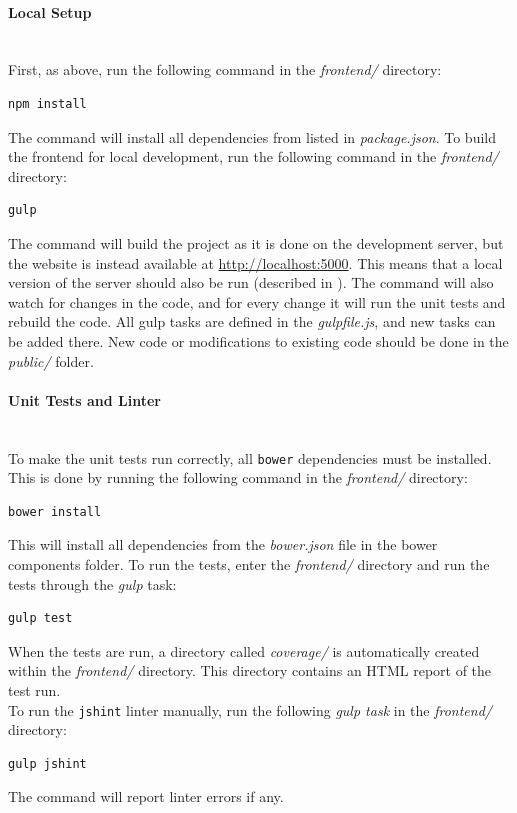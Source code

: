 \paragraph*{Local Setup} \hfill \\
First, as above, run the following command in the \textit{frontend/} directory:
\begin{lstlisting}[language=sh]
npm install
\end{lstlisting}
The command will install all dependencies from listed in \textit{package.json}.
\noindent
To build the frontend for local development, run the following command in the \textit{frontend/} directory:
\begin{lstlisting}
gulp
\end{lstlisting}
The command will build the project as it is done on the development server, but the website is instead available at \url{http://localhost:5000}. This means that a local version of the server should also be run (described in ). The command will also watch for changes in the code, and for every change it will run the unit tests and rebuild the code. All gulp tasks are defined in the \textit{gulpfile.js}, and new tasks can be added there. New code or modifications to existing code should be done in the \textit{public/} folder.

\paragraph*{Unit Tests and Linter} \hfill \\
To make the unit tests run correctly, all \texttt{bower} \cite{BOWER} dependencies must be installed. This is done by running the following command in the \textit{frontend/} directory:
\begin{lstlisting}[language=sh]
bower install
\end{lstlisting}
This will install all dependencies from the \textit{bower.json} file in the bower components folder. To run the tests, enter the \textit{frontend/} directory and run the tests through the \textit{gulp} task:
\begin{lstlisting}
gulp test
\end{lstlisting}
When the tests are run, a directory called \textit{coverage/} is automatically created within the \textit{frontend/} directory. This directory contains an HTML report of the test run.\\

To run the \texttt{jshint} \cite{JSHINT} linter manually, run the following \textit{gulp task} in the \textit{frontend/} directory:
\begin{lstlisting}[language=sh]
gulp jshint
\end{lstlisting}
The command will report linter errors if any.

